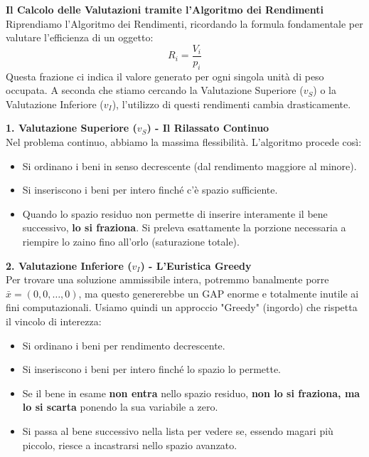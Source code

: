 \documentclass[12pt, a4paper]{article}
\begin{document}
	\vspace{0.4cm}
	\textbf{Il Calcolo delle Valutazioni tramite l'Algoritmo dei Rendimenti}\\
	Riprendiamo l'Algoritmo dei Rendimenti, ricordando la formula fondamentale per valutare l'efficienza di un oggetto:
	\[
	R_i = \frac{V_i}{p_i}
	\]
	Questa frazione ci indica il valore generato per ogni singola unità di peso occupata. A seconda che stiamo cercando la Valutazione Superiore ($v_S$) o la Valutazione Inferiore ($v_I$), l'utilizzo di questi rendimenti cambia drasticamente.
	
	\vspace{0.3cm}
	\textbf{1. Valutazione Superiore ($v_S$) - Il Rilassato Continuo}\\
	Nel problema continuo, abbiamo la massima flessibilità. L'algoritmo procede così:
	\begin{itemize}[label=\textcolor{titlecolor}{\Large\textbullet}, itemsep=2pt, leftmargin=1.5cm]
		\item Si ordinano i beni in senso decrescente (dal rendimento maggiore al minore).
		\item Si inseriscono i beni per intero finché c'è spazio sufficiente.
		\item Quando lo spazio residuo non permette di inserire interamente il bene successivo, \textbf{lo si fraziona}. Si preleva esattamente la porzione necessaria a riempire lo zaino fino all'orlo (saturazione totale).
	\end{itemize}
	
	\vspace{0.3cm}
	\textbf{2. Valutazione Inferiore ($v_I$) - L'Euristica Greedy}\\
	Per trovare una soluzione ammissibile intera, potremmo banalmente porre $\bar{x} = (0,0,\dots,0)$, ma questo genererebbe un GAP enorme e totalmente inutile ai fini computazionali. Usiamo quindi un approccio "Greedy" (ingordo) che rispetta il vincolo di interezza:
	\begin{itemize}[label=\textcolor{titlecolor}{\Large\textbullet}, itemsep=2pt, leftmargin=1.5cm]
		\item Si ordinano i beni per rendimento decrescente.
		\item Si inseriscono i beni per intero finché lo spazio lo permette.
		\item Se il bene in esame \textbf{non entra} nello spazio residuo, \textbf{non lo si fraziona, ma lo si scarta} ponendo la sua variabile a zero.
		\item Si passa al bene successivo nella lista per vedere se, essendo magari più piccolo, riesce a incastrarsi nello spazio avanzato.
	\end{itemize}
	
\end{document}
